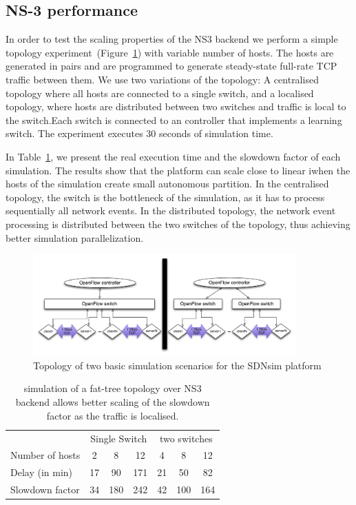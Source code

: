 \subsection{NS-3 performance} \label{sec:sdnsim-ns3-perf}

In order to test the scaling properties of the NS3 backend we perform a simple
topology experiment~(Figure~\ref{Haris-Fig2}) with variable number of hosts.
The hosts are generated in pairs and are programmed to generate steady-state
full-rate TCP traffic between them.  We use two variations of the topology: A
centralised topology where all hosts are  connected to a single switch, and a
localised topology, where hosts are distributed between two switches and traffic
is local to the switch.Each switch is connected to an \of controller that
implements a learning switch. The experiment executes 30 seconds of simulation
time.

In Table~\ref{Haris-Table1}, we present the real execution time and the slowdown
factor of each simulation.  The results show that the platform can scale close
to linear iwhen the hosts of the simulation create small autonomous partition.
In the centralised topology, the \of switch is the bottleneck of the simulation,
as it has to process sequentially all network events. In the distributed
topology, the network event processing is distributed between the two switches
of the topology, thus achieving better simulation parallelization.

\begin{figure}
\includegraphics[width=0.9\textwidth]{sdnsim-topology}
\caption{Topology of two basic simulation scenarios for the SDNsim platform}
\label{Haris-Fig2}
\end{figure}

\begin{table}
\label{Haris-Table1}
\begin{center}
\begin{tabular}{|l|c|c|c|c|c|c|} \hline
&\multicolumn{3}{|c|}{Single Switch} & \multicolumn{3}{|c|}{two switches} \\
\cline{2-7}
Number of hosts & 2 & 8 & 12 & 4 & 8 & 12 \\
\hline 
Delay (in min) & 17 & 90 & 171 & 21 &50 & 82 \\
\hline
Slowdown factor & 34 & 180 & 242 & 42 & 100 & 164 \\
\hline 
\end{tabular}
\end{center}
\caption{\sdnsim simulation of a fat-tree topology over NS3 backend allows
  better scaling of the slowdown factor as the traffic is localised. }
\end{table}

